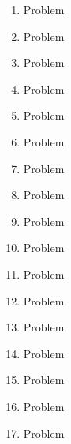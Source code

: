\documentclass[10pt, twoside]{article}
\begin{document}
\begin{justify}
\begin{enumerate}[itemsep=3.76389mm]
\item Problem

\ans{}{}{}{}{}

\item Problem

\ans{}{}{}{}{}

\item Problem

\ans{}{}{}{}{}

\item Problem

\ans{}{}{}{}{}

\item Problem

\ans{}{}{}{}{}

\item Problem

\ans{}{}{}{}{}

\item Problem

\ans{}{}{}{}{}

\item Problem

\ans{}{}{}{}{}

\item Problem

\ans{}{}{}{}{}

\item Problem

\ans{}{}{}{}{}

\item Problem

\ans{}{}{}{}{}

\item Problem

\ans{}{}{}{}{}

\item Problem

\ans{}{}{}{}{}

\item Problem

\ans{}{}{}{}{}

\item Problem

\ans{}{}{}{}{}

\item Problem

\ans{}{}{}{}{}

\item Problem


\end{enumerate}
\end{justify}
\end{document}
